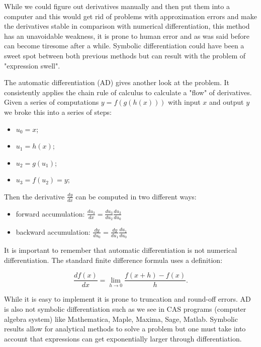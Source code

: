 \documentclass[a4paper,oneside,openright,11pt]{book}
\begin{document}
While we could figure out derivatives manually and then put them into a computer and this would get rid of problems with approximation errors and make the derivatives stable in comparison with numerical differentiation, this method has an unavoidable weakness, it is prone to human error and as was said before can become tiresome after a while. Symbolic differentiation could have been a sweet spot between both previous methods but can result with the problem of "expression swell".

The automatic differentiation (AD) gives another look at the problem. It consistently applies the chain rule of calculus to calculate a "flow" of derivatives. Given a series of computations $y = f(g(h(x)))$ with input $x$ and output $y$ we broke this into a series of steps: \cite{raschka}

\begin{itemize}
    \item $u_{0} = x$;
    \item $u_{1} = h(x)$;
    \item $u_{2} = g(u_{1})$;
    \item $u_{3} = f(u_{2}) = y$;
\end{itemize}

Then the derivative $\frac{dy}{dx}$ can be computed in two different ways:

\begin{itemize}
    \item forward accumulation: $\frac{du_{3}}{dx} = \frac{du_{3}}{du_{2}}\frac{du_{2}}{du_{0}}$
    \item backward accumulation: $\frac{dy}{du_{0}} = \frac{dy}{du_{1}}\frac{du_{1}}{du_{0}}$
\end{itemize}






It is important to remember that automatic differentiation is not numerical differentiation. The standard finite difference formula uses a definition:

\begin{equation}
    \frac{d f(x)}{dx} = \lim_{h \to 0} \frac{f(x + h) - f(x)}{h}.
\end{equation}

While it is easy to implement it is prone to truncation and round-off errors. AD is also not symbolic differentiation such as we see in CAS programs (computer algebra system) like Mathematica, Maple, Maxima, Sage, Matlab. Symbolic results allow for analytical methods to solve a problem but one must take into account that expressions can get exponentially larger through differentiation. \cite{baydin2014automatic}
\end{document}
